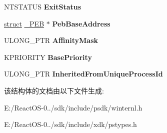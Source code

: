 \begin{DoxyCompactItemize}
N\+T\+S\+T\+A\+T\+US {\bfseries Exit\+Status}
\item 
\mbox{\label{struct___p_r_o_c_e_s_s___b_a_s_i_c___i_n_f_o_r_m_a_t_i_o_n_a5bcbc6063b16578d0560fafe90a231f3}} 
\hyperlink{interfacestruct}{struct} \hyperlink{struct___p_e_b}{\+\_\+\+P\+EB} $\ast$ {\bfseries Peb\+Base\+Address}
\item 
\mbox{\label{struct___p_r_o_c_e_s_s___b_a_s_i_c___i_n_f_o_r_m_a_t_i_o_n_a20e026bd9c4a44748c1e58be8e01f087}} 
U\+L\+O\+N\+G\+\_\+\+P\+TR {\bfseries Affinity\+Mask}
\item 
\mbox{\label{struct___p_r_o_c_e_s_s___b_a_s_i_c___i_n_f_o_r_m_a_t_i_o_n_a93c0fbdaa1cad6f828bcf17300aff8f3}} 
K\+P\+R\+I\+O\+R\+I\+TY {\bfseries Base\+Priority}
\item 
\mbox{\label{struct___p_r_o_c_e_s_s___b_a_s_i_c___i_n_f_o_r_m_a_t_i_o_n_a3f8ec42c62876c0498599957a97a4a10}} 
U\+L\+O\+N\+G\+\_\+\+P\+TR {\bfseries Inherited\+From\+Unique\+Process\+Id}
\end{DoxyCompactItemize}


该结构体的文档由以下文件生成\+:\begin{DoxyCompactItemize}
\item 
E\+:/\+React\+O\+S-\/0../sdk/include/psdk/winternl.\+h\item 
E\+:/\+React\+O\+S-\/0../sdk/include/xdk/pstypes.\+h\end{DoxyCompactItemize}
